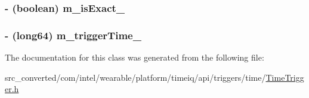 \subsubsection[{m\+\_\+is\+Exact\+\_\+}]{\setlength{\rightskip}{0pt plus 5cm}-\/ (boolean) m\+\_\+is\+Exact\+\_\+}\label{interface_time_trigger_a9cc6d7cb43b84d86926ccfbd1a71eae0}
\hypertarget{interface_time_trigger_a2d1356a1165ada32d5a2bff8bc90a598}{}
\subsubsection[{m\+\_\+trigger\+Time\+\_\+}]{\setlength{\rightskip}{0pt plus 5cm}-\/ (long64) m\+\_\+trigger\+Time\+\_\+}\label{interface_time_trigger_a2d1356a1165ada32d5a2bff8bc90a598}


The documentation for this class was generated from the following file\+:\begin{DoxyCompactItemize}
\item 
src\+\_\+converted/com/intel/wearable/platform/timeiq/api/triggers/time/\hyperlink{_time_trigger_8h}{Time\+Trigger.\+h}\end{DoxyCompactItemize}
